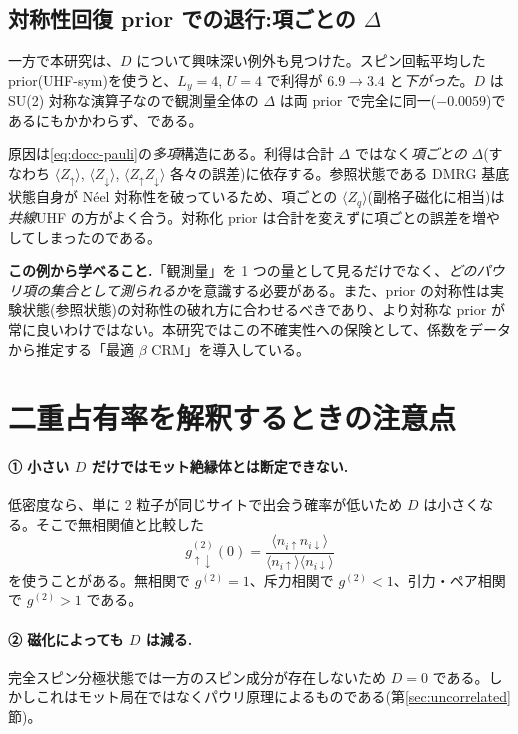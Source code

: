 \documentclass[11pt,a4paper]{ltjsarticle}
\newcommand{\ev}[1]{\langle #1\rangle}
\newcommand{\up}{\uparrow}
\newcommand{\dn}{\downarrow}
\begin{document}
\subsection{対称性回復 prior での退行:項ごとの $\Delta$}
一方で本研究は、$D$ について興味深い例外も見つけた。スピン回転平均した prior(UHF-sym)を使うと、$L_y=4$, $U=4$ で利得が $6.9\to3.4$ と\emph{下がった}。$D$ は SU(2) 対称な演算子なので観測量全体の $\Delta$ は両 prior で完全に同一($-0.0059$)であるにもかかわらず、である。

原因は\eqref{eq:docc-pauli}の\emph{多項}構造にある。利得は合計 $\Delta$ ではなく\emph{項ごとの} $\Delta$(すなわち $\ev{Z_\up}$, $\ev{Z_\dn}$, $\ev{Z_\up Z_\dn}$ 各々の誤差)に依存する。参照状態である DMRG 基底状態自身が Néel 対称性を破っているため、項ごとの $\ev{Z_q}$(副格子磁化に相当)は\emph{共線}UHF の方がよく合う。対称化 prior は合計を変えずに項ごとの誤差を増やしてしまったのである。

\begin{keybox}
\textbf{この例から学べること.}「観測量」を 1 つの量として見るだけでなく、\emph{どのパウリ項の集合として測られるか}を意識する必要がある。また、prior の対称性は実験状態(参照状態)の対称性の破れ方に合わせるべきであり、より対称な prior が常に良いわけではない。本研究ではこの不確実性への保険として、係数をデータから推定する「最適 $\beta$ CRM」を導入している。
\end{keybox}

\section{二重占有率を解釈するときの注意点}
\label{sec:caution}

\paragraph{① 小さい $D$ だけではモット絶縁体とは断定できない.}低密度なら、単に 2 粒子が同じサイトで出会う確率が低いため $D$ は小さくなる。そこで無相関値と比較した
\begin{equation}
  g^{(2)}_{\up\dn}(0) = \frac{\ev{n_{i\up}n_{i\dn}}}{\ev{n_{i\up}}\ev{n_{i\dn}}}
\end{equation}
を使うことがある。無相関で $g^{(2)}=1$、斥力相関で $g^{(2)}<1$、引力・ペア相関で $g^{(2)}>1$ である。

\paragraph{② 磁化によっても $D$ は減る.}完全スピン分極状態では一方のスピン成分が存在しないため $D=0$ である。しかしこれはモット局在ではなくパウリ原理によるものである(第\ref{sec:uncorrelated}節)。
\end{document}

